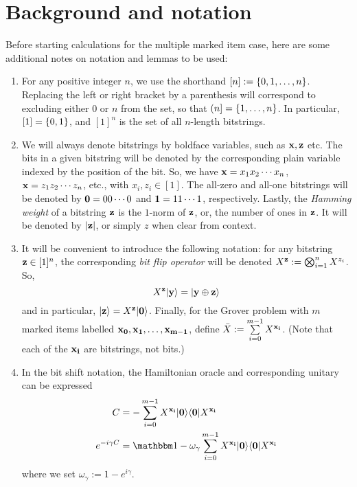 \documentclass[11pt]{article}
\begin{document}
\section{Background and notation}

Before starting calculations for the multiple marked item case, here are some additional notes on notation and lemmas to be used:
\begin{enumerate}
\item For any positive integer $n$, we use the shorthand $[n]:= \left\{0,1,\ldots, n\right\}$. Replacing the left or right bracket by a parenthesis will correspond to excluding either $0$ or $n$ from the set, so that $(n] = \left\{1,\ldots, n\right\}$. In particular, $[1] = \left\{0,1\right\}$, and $[1]^n$ is the set of all $n$-length bitstrings.
\item We will always denote bitstrings by boldface variables, such as $\mathbf{x}, \mathbf{z}$ etc. The bits in a given bitstring will be denoted by the corresponding plain variable indexed by the position of the bit. So, we have $\mathbf{x} = x_1x_2\cdots x_n$, $\mathbf{x} = z_1z_2\cdots z_n$, etc., with $x_i, z_i \in [1]$. The all-zero and all-one bitstrings will be denoted by $\mathbf{0} = 00\cdots 0$ and $\mathbf{1} = 11\cdots 1$, respectively. Lastly, the \emph{Hamming weight} of a bitstring $\mathbf{z}$ is the $1$-norm of $\mathbf{z}$, or, the number of ones in $\mathbf{z}$. It will be denoted by $|\mathbf{z}|$, or simply $z$ when clear from context. 
\item It will be convenient to introduce the
  following notation: for any bitstring $\mathbf{z}\in[1]^n$,
  the corresponding \emph{bit flip operator} will be denoted $X^{\mathbf{z}} := \bigotimes_{i=1}^{n}X^{z_i}$. So,
$$X^{\mathbf{z}}|\mathbf{y}\rangle = |\mathbf{y}\oplus \mathbf{z}\rangle
$$
and in particular, $|\mathbf{z}\rangle = X^{\mathbf{z}}|\mathbf{0}\rangle$. Finally, for the Grover problem with $m$ marked items labelled $\mathbf{x_0},\mathbf{x_1},\ldots, \mathbf{x_{m-1}}$, define $\bar{X} := \sum\limits_{i=0}^{m-1}X^{\mathbf{x_i}}$. (Note that each of the $\mathbf{x_i}$ are bitstrings, not bits.)
\item In the bit shift notation, the Hamiltonian oracle and corresponding unitary can be expressed
  \begin{align}
    \label{eq:bitshiftoracle}
    C &= -\suml{i=0}{m-1}{X^{\str{x_i}}\ket{\str{0}}\bra{\str{0}}}X^{\str{x_i}}\\
    e^{-i\gamma C} &= \id - \omega_\gamma\suml{i=0}{m-1}{X^{\str{x_i}}\ket{\str{0}}\bra{\str{0}}}X^{\str{x_i}}
  \end{align}
where we set $\omega_\gamma:= 1-e^{i\gamma}$.

\end{enumerate}
\end{document}
